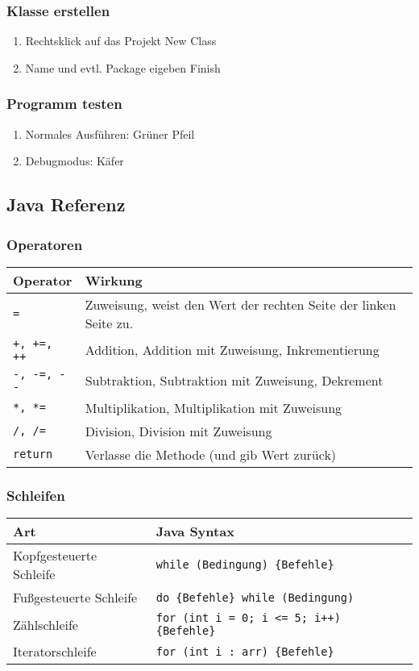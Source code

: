 		\subsubsection{Klasse erstellen}
		\begin{enumerate}
		\item Rechtsklick auf das Projekt \frqq New \frqq Class
		\item Name und evtl. Package eigeben \frqq Finish
		\end{enumerate}

		\subsubsection{Programm testen}
		\begin{enumerate}
		\item Normales Ausführen: Grüner Pfeil
		\item Debugmodus: Käfer
		\end{enumerate}

	\subsection{Java Referenz}
		\subsubsection{Operatoren}
		\begin{tabular}{ll}
		\textbf{Operator} & \textbf{Wirkung}\\
		\hline
		\lstinline$=$ & Zuweisung, weist den Wert der rechten Seite der linken Seite zu.\\
		\lstinline$+, +=, ++$ & Addition, Addition mit Zuweisung, Inkrementierung\\
		\lstinline$-, -=, --$ & Subtraktion, Subtraktion mit Zuweisung, Dekrement\\
		\lstinline$*, *=$ & Multiplikation, Multiplikation mit Zuweisung\\
		\lstinline$/, /=$ & Division, Division mit Zuweisung\\
		\lstinline$return$ & Verlasse die Methode (und gib Wert zurück)\\
		\end{tabular}

		\subsubsection{Schleifen}
		\begin{tabular}{ll}
		\textbf{Art} & \textbf{Java Syntax}\\
		\hline
		Kopfgesteuerte Schleife & \lstinline$while (Bedingung) {Befehle}$\\
		Fußgesteuerte Schleife & \lstinline$do {Befehle} while (Bedingung)$\\
		Zählschleife & \lstinline$for (int i = 0; i <= 5; i++) {Befehle}$\\
		Iteratorschleife & \lstinline$for (int i : arr) {Befehle}$\\
		
		\end{tabular}

